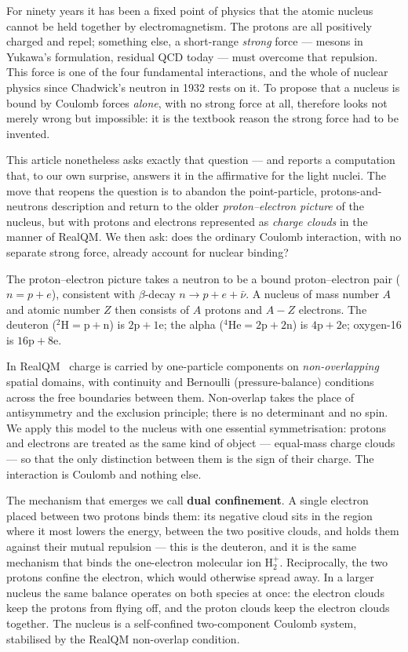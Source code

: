 \documentclass[11pt]{article}
\begin{document}
For ninety years it has been a fixed point of physics that the atomic nucleus cannot be held
together by electromagnetism. The protons are all positively charged and repel; something else,
a short-range \emph{strong} force --- mesons in Yukawa's formulation, residual QCD today --- must
overcome that repulsion. This force is one of the four fundamental interactions, and the whole of
nuclear physics since Chadwick's neutron in 1932 rests on it. To propose that a nucleus is bound
by Coulomb forces \emph{alone}, with no strong force at all, therefore looks not merely wrong but
impossible: it is the textbook reason the strong force had to be invented.

This article nonetheless asks exactly that question --- and reports a computation that, to our
own surprise, answers it in the affirmative for the light nuclei. The move that reopens the
question is to abandon the point-particle, protons-and-neutrons description and return to the
older \emph{proton--electron picture} of the nucleus, but with protons and electrons represented
as \emph{charge clouds} in the manner of RealQM. We then ask: does the ordinary Coulomb
interaction, with no separate strong force, already account for nuclear binding?

The proton--electron picture takes a neutron to be a bound proton--electron pair
($n = p + e$), consistent with $\beta$-decay $n\to p+e+\bar\nu$. A nucleus of mass number $A$
and atomic number $Z$ then consists of $A$ protons and $A-Z$ electrons. The deuteron
($^2\mathrm{H}=\mathrm{p}+\mathrm{n}$) is $\mathrm{2p}+\mathrm{1e}$; the alpha
($^4\mathrm{He}=\mathrm{2p}+\mathrm{2n}$) is $\mathrm{4p}+\mathrm{2e}$; oxygen-16 is
$\mathrm{16p}+\mathrm{8e}$.

In RealQM~\cite{Johnson-RealQM,Johnson-Atoms} charge is carried by one-particle components on
\emph{non-overlapping} spatial domains, with continuity and Bernoulli (pressure-balance)
conditions across the free boundaries between them. Non-overlap takes the place of
antisymmetry and the exclusion principle; there is no determinant and no spin. We apply this
model to the nucleus with one essential symmetrisation: protons and electrons are treated as
the same kind of object --- equal-mass charge clouds --- so that the only distinction between
them is the sign of their charge. The interaction is Coulomb and nothing else.

The mechanism that emerges we call \textbf{dual confinement}. A single electron placed between
two protons binds them: its negative cloud sits in the region where it most lowers the energy,
between the two positive clouds, and holds them against their mutual repulsion --- this is the
deuteron, and it is the same mechanism that binds the one-electron molecular ion
$\mathrm{H}_2^+$. Reciprocally, the two protons confine the electron, which would otherwise
spread away. In a larger nucleus the same balance operates on both species at once: the
electron clouds keep the protons from flying off, and the proton clouds keep the electron
clouds together. The nucleus is a self-confined two-component Coulomb system, stabilised by the
RealQM non-overlap condition.
\end{document}
